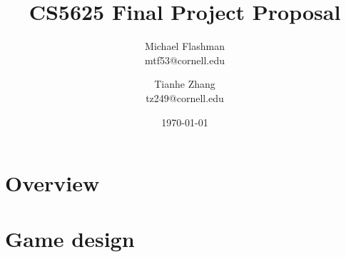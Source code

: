 \documentclass[11pt]{article}
\begin{document}
\title{CS5625 Final Project Proposal}
\author{Michael Flashman \\ mtf53@cornell.edu \and Tianhe Zhang \\ tz249@cornell.edu\\}
\date{\today}
\maketitle


\section{Overview}

\section{Game design}

\end{document}
